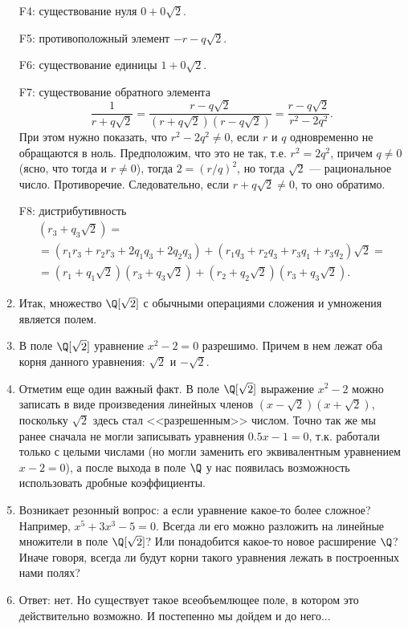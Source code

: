 \begin{enumerate}
F4: существование нуля $0+0\sqrt 2$.

F5: противоположный элемент $-r-q\sqrt 2$.

F6: существование единицы $1+0\sqrt 2$.

F7: существование обратного элемента
$$
\frac{1}{r+q\sqrt 2} = \frac{r-q\sqrt 2}{(r+q\sqrt 2)(r-q\sqrt 2)} = \frac{r-q\sqrt 2}{r^2-2q^2}.
$$
При этом нужно показать, что $r^2-2q^2\ne 0$, если $r$ и $q$ одновременно не обращаются в ноль. Предположим, что это не так, т.е. $r^2=2q^2$, причем $q\ne 0$ (ясно, что тогда и $r\ne 0$), тогда $2=(r/q)^2$, но тогда $\sqrt 2$ --- рациональное число. Противоречие. Следовательно, если $r+q\sqrt 2\ne 0$, то оно обратимо.

F8: дистрибутивность
\begin{multline*}
[(r_1+q_1\sqrt 2) + (r_2+q_2\sqrt 2)](r_3+q_3\sqrt 2) = \\
= (r_1r_3+r_2r_3+2q_1q_3+2q_2q_3) + (r_1q_3+r_2q_3+r_3q_1+r_3q_2)\sqrt 2 = \\
= (r_1+q_1\sqrt 2)(r_3+q_3\sqrt 2) + (r_2+q_2\sqrt 2)(r_3+q_3\sqrt 2).
\end{multline*}

\item Итак, множество $\Q[\sqrt 2]$ с обычными операциями сложения и умножения является полем.
\item В поле $\Q[\sqrt 2]$ уравнение $x^2-2=0$ разрешимо. Причем в нем лежат оба корня данного уравнения: $\sqrt 2$ и $-\sqrt 2$.
\item Отметим еще один важный факт. В поле $\Q[\sqrt 2]$ выражение $x^2-2$ можно записать в виде произведения линейных членов $(x-\sqrt 2)(x+\sqrt 2)$, поскольку $\sqrt 2$ здесь стал <<разрешенным>> числом. Точно так же мы ранее сначала не могли записывать уравнения $0.5x-1=0$, т.к. работали только с целыми числами (но могли заменить его эквивалентным уравнением $x-2=0$), а после выхода в поле $\Q$ у нас появилась возможность использовать дробные коэффициенты.
\item Возникает резонный вопрос: а если уравнение какое-то более сложное? Например, $x^5+3x^3-5=0$. Всегда ли его можно разложить на линейные множители в поле $\Q[\sqrt 2]$? Или понадобится какое-то новое расширение $\Q$?
Иначе говоря, всегда ли будут корни такого уравнения лежать в построенных нами полях?
\item Ответ: нет. Но существует такое всеобъемлющее поле, в котором это действительно возможно. И постепенно мы дойдем и до него...
\end{enumerate}



